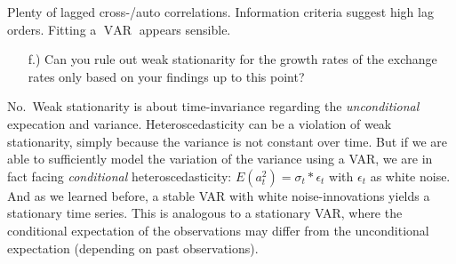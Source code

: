 \documentclass[12pt,a4paper]{article}
\newcommand{\VAR}{\operatorname{VAR}} %
\begin{document}
Plenty of lagged cross-/auto correlations. Information criteria suggest
high lag orders. Fitting a \(\VAR\) appears sensible.

\begin{itemize}
  \item[f.)] Can you rule out weak stationarity for the growth rates of the exchange rates only based on your findings up to this point?
\end{itemize}

No.~Weak stationarity is about time-invariance regarding the
\emph{unconditional} expecation and variance. Heteroscedasticity can be
a violation of weak stationarity, simply because the variance is not
constant over time. But if we are able to sufficiently model the
variation of the variance using a VAR, we are in fact facing
\emph{conditional} heteroscedasticity:
\(E(a_{t}^2) = \sigma_{t} * \epsilon_{t}\) with \(\epsilon_{t}\) as
white noise. And as we learned before, a stable VAR with white
noise-innovations yields a stationary time series. This is analogous to
a stationary VAR, where the conditional expectation of the observations
may differ from the unconditional expectation (depending on past
observations).
\end{document}
